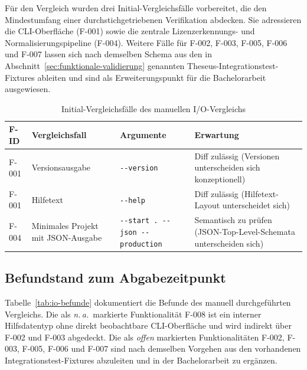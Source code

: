 Für den Vergleich wurden drei Initial-Vergleichsfälle vorbereitet, die den Mindestumfang einer durchstichgetriebenen Verifikation abdecken. Sie adressieren die CLI-Oberfläche (F-001) sowie die zentrale Lizenzerkennungs- und Normalisierungspipeline (F-004). Weitere Fälle für F-002, F-003, F-005, F-006 und F-007 lassen sich nach demselben Schema aus den in Abschnitt~\ref{sec:funktionale-validierung} genannten Theseus-Integrationstest-Fixtures ableiten und sind als Erweiterungspunkt für die Bachelorarbeit ausgewiesen.

\begin{table}[H]
\centering
\begin{tabular}{|p{2.0cm}|p{3.2cm}|p{4.0cm}|p{4.0cm}|}
\hline
\textbf{F-ID} & \textbf{Vergleichsfall} & \textbf{Argumente} & \textbf{Erwartung} \\
\hline
F-001 & Versionsausgabe & \texttt{-{}-version} & Diff zulässig (Versionen unterscheiden sich konzeptionell) \\
\hline
F-001 & Hilfetext & \texttt{-{}-help} & Diff zulässig (Hilfetext-Layout unterscheidet sich) \\
\hline
F-004 & Minimales Projekt mit JSON-Ausgabe & \texttt{-{}-start . -{}-json -{}-production} & Semantisch zu prüfen (JSON-Top-Level-Schemata unterscheiden sich) \\
\hline
\end{tabular}
\caption{Initial-Vergleichsfälle des manuellen I/O-Vergleichs}
\label{tab:io-fixtures}
\end{table}

\subsection{Befundstand zum Abgabezeitpunkt}\label{anhang:befunde}

Tabelle~\ref{tab:io-befunde} dokumentiert die Befunde des manuell durchgeführten Vergleichs. Die als \emph{n.\,a.}\ markierte Funktionalität F-008 ist ein interner Hilfsdatentyp ohne direkt beobachtbare CLI-Oberfläche und wird indirekt über F-002 und F-003 abgedeckt. Die als \emph{offen} markierten Funktionalitäten F-002, F-003, F-005, F-006 und F-007 sind nach demselben Vorgehen aus den vorhandenen Integrationstest-Fixtures abzuleiten und in der Bachelorarbeit zu ergänzen.

